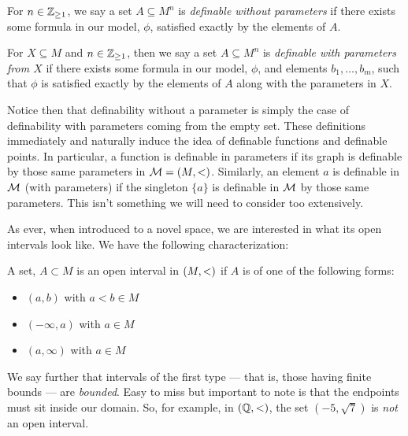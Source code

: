\begin{definition}
For $n \in \mathbb{Z}_{\geq 1}$, we say a set $A \subseteq M^n$ is \emph{definable without parameters} if there exists some formula in our model, $ \phi$, satisfied exactly by the elements of $A$.
\end{definition}

\begin{definition}
For $X \subseteq M$ and $n \in \mathbb{Z}_{\geq 1}$, then we say a set $A \subseteq M^n$ is \emph{definable with parameters from $X$} if there exists some formula in our model, $ \phi$, and elements $b_1, \hdots, b_m$, such that $ \phi$ is satisfied exactly by the elements of $A$ along with the parameters in $X$.
\end{definition}

Notice then that definability without a parameter is simply the case of definability with parameters coming from the empty set. These definitions immediately and naturally induce the idea of definable functions and definable points. In particular, a function is definable in parameters if its graph is definable by those same parameters in $\mathcal{M} = (M, <)$. Similarly, an element $a$ is definable in $\mathcal{M}$ (with parameters) if the singleton $\{a\}$ is definable in $ \mathcal{M}$ by those same parameters. This isn't something we will need to consider too extensively.

As ever, when introduced to a novel space, we are interested in what its open intervals look like. We have the following characterization:

\begin{definition}
  A set, $A \subset M$ is an open interval in $(M, <)$ if $A$ is of one of the following forms:
  \begin{itemize}
    \item $(a, b)$ with $a < b \in M$
    \item $(- \infty, a)$ with $a \in M$
    \item $(a, \infty)$ with $a \in M$
  \end{itemize}
\end{definition}

We say further that intervals of the first type — that is, those having finite bounds — are \emph{bounded}. Easy to miss but important to note is that the endpoints must sit inside our domain. So, for example, in $(\mathbb{Q}, <)$, the set $(-5, \sqrt{7})$ is \emph{not} an open interval.

